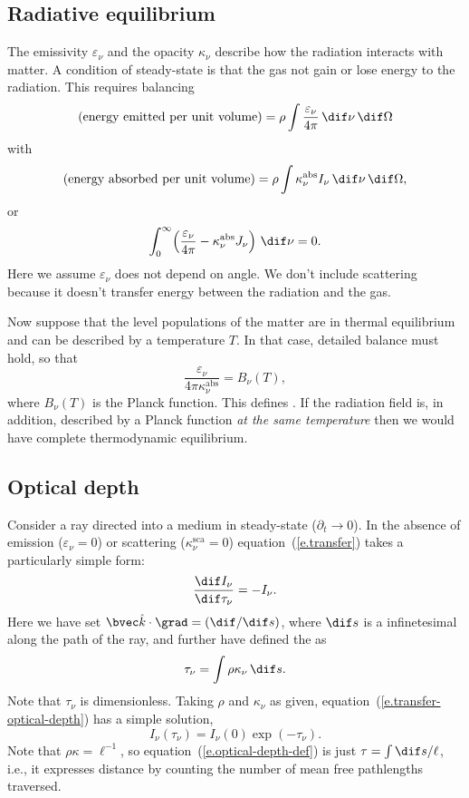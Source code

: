 \subsection{Radiative equilibrium} 
The emissivity $\varepsilon_{\nu}$ and the opacity $\kappa_{\nu}$ describe how the radiation interacts with matter. A condition of steady-state is that the gas not gain or lose energy to the radiation. This requires balancing
\[ \left(\textrm{energy emitted per unit volume}\right) = \rho\int\frac{\varepsilon_{\nu}}{4\pi}\,\dif\nu\,\dif\Omega\] 
with
\[ \left(\textrm{energy absorbed per unit volume}\right) = \rho\int \kappa_{\nu}^{\mathrm{abs}} I_{\nu}\,\dif\nu\,\dif\Omega,\]
or
\begin{equation}\label{e.rad-equil}
\int_{0}^{\infty}\! \left(\frac{\varepsilon_{\nu}}{4\pi} - \kappa_{\nu}^{\mathrm{abs}} J_{\nu}\right)\,\dif\nu = 0.
\end{equation}
Here we assume $\varepsilon_{\nu}$ does not depend on angle. We don't include scattering because it doesn't transfer energy between the radiation and the gas.

Now suppose that the level populations of the matter are in thermal equilibrium and can be described by a temperature $T$.  In that case, detailed balance must hold, so that
\begin{equation}\label{e.detail-balance}
\frac{\varepsilon_{\nu}}{4\pi\kappa_{\nu}^{\mathrm{abs}}} = B_{\nu}(T),
\end{equation}
where $B_{\nu}(T)$ is the Planck function. This defines . If the radiation field is, in addition, described by a Planck function \emph{at the same temperature} then we would have complete thermodynamic equilibrium.

\subsection{Optical depth}

Consider a ray directed into a medium in steady-state ($\partial_{t}\to 0$).  In the absence of emission ($\varepsilon_{\nu}=0$) or scattering ($\kappa_{\nu}^{\mathrm{sca}}=0$) equation~(\ref{e.transfer}) takes a particularly simple form:
\begin{equation}\label{e.transfer-optical-depth}
\frac{\dif I_{\nu}}{\dif \tau_{\nu}} = -I_{\nu}.
\end{equation}
Here we have set $\unitk\cdot\grad = (\dif/\dif s)$, where $\dif s$ is a infinetesimal along the path of the ray, and further have defined the  as
\begin{equation}\label{e.optical-depth-def}
\tau_{\nu} = \int \rho\kappa_{\nu}\,\dif s.
\end{equation}
Note that $\tau_{\nu}$ is dimensionless. Taking $\rho$ and $\kappa_{\nu}$ as given, equation~(\ref{e.transfer-optical-depth}) has a simple solution,
\[ I_{\nu}(\tau_{\nu}) = I_{\nu}(0)\exp\left(-\tau_{\nu}\right). \]
Note that $\rho\kappa=\ell^{-1}$, so equation~(\ref{e.optical-depth-def}) is just $\tau = \int \dif s/\ell$, i.e., it expresses distance by counting the number of mean free pathlengths traversed.


